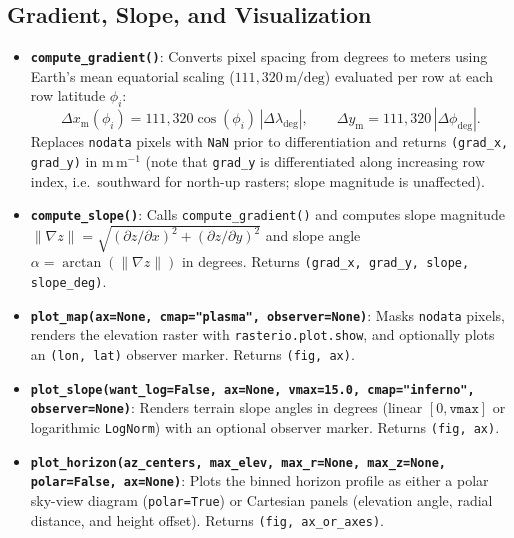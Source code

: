 \documentclass[11pt,letterpaper]{article}
\begin{document}
\subsection{Gradient, Slope, and Visualization}
\begin{itemize}
  \item \textbf{\texttt{compute\_gradient()}}: Converts pixel spacing from degrees to meters using Earth's mean equatorial scaling ($111{,}320\,\text{m/deg}$) evaluated per row at each row latitude $\phi_i$:
  \begin{equation}
    \Delta x_{\mathrm{m}}(\phi_i) = 111{,}320 \cos(\phi_i) \, |\Delta\lambda_{\mathrm{deg}}|, \qquad
    \Delta y_{\mathrm{m}} = 111{,}320 \, |\Delta\phi_{\mathrm{deg}}|.
  \end{equation}
  Replaces \texttt{nodata} pixels with \texttt{NaN} prior to differentiation and returns \texttt{(grad\_x, grad\_y)} in $\mathrm{m\,m^{-1}}$ (note that \texttt{grad\_y} is differentiated along increasing row index, i.e.\ southward for north-up rasters; slope magnitude is unaffected).
  \item \textbf{\texttt{compute\_slope()}}: Calls \texttt{compute\_gradient()} and computes slope magnitude $\|\nabla z\| = \sqrt{(\partial z/\partial x)^2 + (\partial z/\partial y)^2}$ and slope angle $\alpha = \arctan(\|\nabla z\|)$ in degrees. Returns \texttt{(grad\_x, grad\_y, slope, slope\_deg)}.
  \item \textbf{\texttt{plot\_map(ax=None, cmap="plasma", observer=None)}}: Masks \texttt{nodata} pixels, renders the elevation raster with \texttt{rasterio.plot.show}, and optionally plots an \texttt{(lon, lat)} observer marker. Returns \texttt{(fig, ax)}.
  \item \textbf{\texttt{plot\_slope(want\_log=False, ax=None, vmax=15.0, cmap="inferno", observer=None)}}: Renders terrain slope angles in degrees (linear $[0, \texttt{vmax}]$ or logarithmic \texttt{LogNorm}) with an optional observer marker. Returns \texttt{(fig, ax)}.
  \item \textbf{\texttt{plot\_horizon(az\_centers, max\_elev, max\_r=None, max\_z=None, polar=False, ax=None)}}: Plots the binned horizon profile as either a polar sky-view diagram (\texttt{polar=True}) or Cartesian panels (elevation angle, radial distance, and height offset). Returns \texttt{(fig, ax\_or\_axes)}.
\end{itemize}
\end{document}

